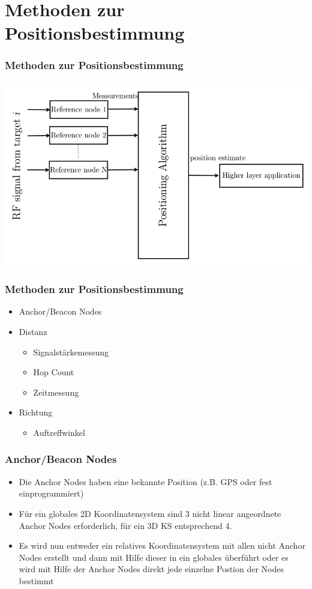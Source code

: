 \section{Methoden zur Positionsbestimmung}
\label{sec:methoden}

\begin{frame}
  \frametitle{Methoden zur Positionsbestimmung}
  \begin{center}
    \includegraphics[scale=0.35]{img/algo_1}
  \end{center}
\end{frame}

\begin{frame}
  \frametitle{Methoden zur Positionsbestimmung}

  \begin{itemize}
  \item Anchor/Beacon Nodes
  \item Distanz
    \begin{itemize}
      \item Signalstärkemessung
      \item Hop Count
      \item Zeitmessung
    \end{itemize}
  \item Richtung
  \begin{itemize}
    \item Auftreffwinkel
  \end{itemize}
  \end{itemize}
\end{frame}

\begin{frame}
  \frametitle{Anchor/Beacon Nodes}

  \begin{itemize}
  \item Die Anchor Nodes haben eine bekannte Position (z.B. GPS oder
    fest einprogrammiert)
  \item Für ein globales 2D Koordinatensystem sind 3 nicht linear
    angeordnete Anchor Nodes erforderlich, für ein 3D KS entsprechend
    4.
  \item Es wird nun entweder ein relatives Koordinatensystem mit allen
    nicht Anchor Nodes erstellt und dann mit Hilfe dieser in ein
    globales überführt oder es wird mit Hilfe der Anchor Nodes direkt
    jede einzelne Postion der Nodes bestimmt
  \end{itemize}
\end{frame}

